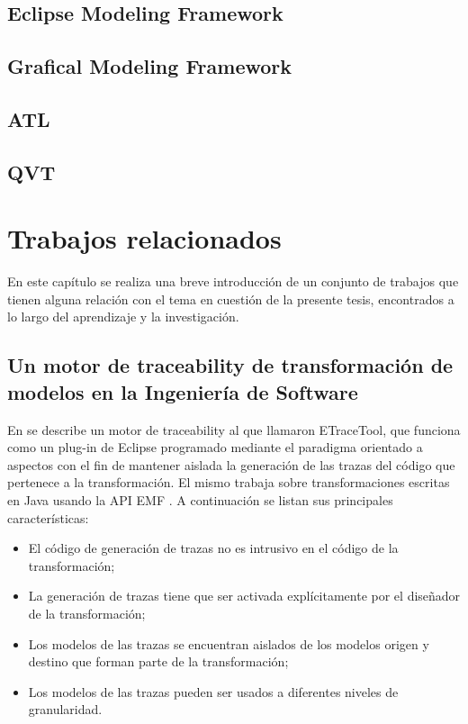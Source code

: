 \documentclass[a4paper,12pt,oneside]{book}
\begin{document}
\section{Eclipse Modeling Framework}

\section{Grafical Modeling Framework}

\section{ATL}

\section{QVT}


\chapter{Trabajos relacionados}

En este capítulo se realiza una breve introducción de un conjunto de trabajos que tienen alguna relación con el tema en cuestión de la presente tesis, encontrados a lo largo del aprendizaje y la investigación.

\section{Un motor de traceability de transformación de modelos en la Ingeniería de Software}

En \cite{AmarLeblancCoulette} se describe un motor de traceability al que llamaron ETraceTool, que funciona como un plug-in de Eclipse programado mediante el paradigma orientado a aspectos con el fin de mantener aislada la generación de las trazas del código que pertenece a la transformación. El mismo trabaja sobre transformaciones escritas en Java usando la API EMF \cite{EMF}. A continuación se listan sus principales características:

\begin{itemize}
\item     El código de generación de trazas no es intrusivo en el código de la transformación;
\item    La generación de trazas tiene que ser activada explícitamente por el diseñador de la transformación;
\item    Los modelos de las trazas se encuentran aislados de los modelos origen y destino que forman parte de la transformación;
\item    Los modelos de las trazas pueden ser usados a diferentes niveles de granularidad.
\end{itemize}
\end{document}

